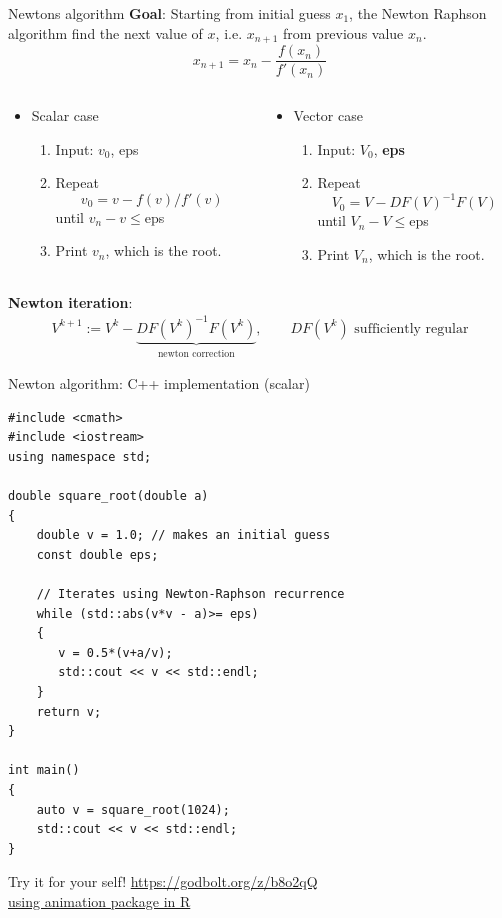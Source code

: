 \documentclass[xcolor=dvipsnames]{beamer}
\begin{document}
\begin{frame}{Newtons algorithm}
\textbf{Goal}: Starting from initial guess $x_1$, the Newton Raphson algorithm find the next value of $x$, i.e. $x_{n+1}$ from
previous value $x_n$.
\[x_{n+1}=x_n - \frac{f(x_n)}{f'(x_n)}\]
\begin{columns}
	\begin{column}{.55\textwidth}
		\begin{itemize}
		\item Scalar case
			\begin{enumerate}
				\item Input: $v_0$, eps
				\item Repeat
				\[v_0 = v - f(v)/f'(v)\]
				until $v_n-v\le$eps
				\item Print $v_n$, which is the root.
			\end{enumerate}
		\end{itemize}
	\end{column}
	\begin{column}{.75\textwidth}
 		\begin{itemize}
		\item Vector case
			\begin{enumerate}
				\item Input: $V_0$, \textbf{eps}
				\item Repeat
				\[V_0 = V - DF(V)^{-1} F(V)\]
				until $V_n-V\le$eps
				\item Print $V_n$, which is the root.
			\end{enumerate}
		\end{itemize}
    \end{column}
\end{columns}
\textbf{Newton iteration}:
\begin{align*}
 	V^{k+1}:= V^k - \underbrace{DF(V^k)^{-1}F(V^k)}_{\text{newton correction}},\qquad DF(V^k)\,\,\text{sufficiently regular}
 \end{align*} 

\end{frame}

\begin{frame}[fragile, shrink=10]{Newton algorithm: C++ implementation (scalar)}
\begin{verbatim}
#include <cmath>
#include <iostream>
using namespace std;

double square_root(double a)
{
    double v = 1.0; // makes an initial guess
    const double eps;

    // Iterates using Newton-Raphson recurrence
    while (std::abs(v*v - a)>= eps)
    {
       v = 0.5*(v+a/v);
       std::cout << v << std::endl;
    }
    return v;
}

int main()
{
    auto v = square_root(1024);
    std::cout << v << std::endl;
}
\end{verbatim}
Try it for your self!  \url{https://godbolt.org/z/b8o2qQ}\\
\href{https://github.com/leannejdong/Lachine-Est/blob/master/r/newton.pdf}{using animation package in R}
\end{frame}
\end{document}
